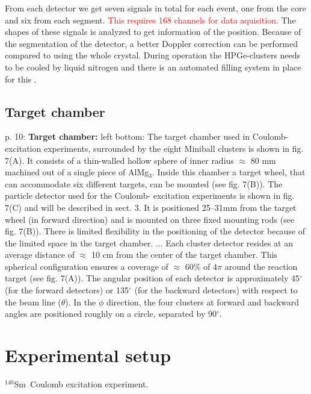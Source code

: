 \documentclass[twoside,english]{uiofysmaster/uiofysmaster}
\newcommand{\Sm}{$^{140}$Sm} %
\begin{document}
From each detector we get seven signals in total for each event, one from the core and six from each segment. \textcolor{red}{This requires 168 channels for data aquisition.} The shapes of these signals is analyzed to get information of the position. Because of the segmentation of the detector, a better Doppler correction can be performed compared to using the whole crystal. During operation the HPGe-clusters needs to be cooled by liquid nitrogen and there is an automated filling system in place for this \cite{NWarr-HPGe}. 


\subsection{Target chamber}
p. 10: \newline
\textbf{Target chamber:} \newline
left bottom: \newline
The target chamber used in Coulomb-excitation experiments, surrounded by the eight Miniball clusters is shown in fig. 7(A). It consists of a thin-walled hollow sphere of inner radius $\approx$ 80 mm machined out of a single piece of AlMg$_3$. Inside this chamber a target wheel, that can accommodate six different targets, can be mounted (see fig. 7(B)). The particle detector used for the Coulomb- excitation experiments is shown in fig. 7(C) and will be described in sect. 3. It is positioned 25–31mm from the target wheel (in forward direction) and is mounted on three fixed mounting rods (see fig. 7(B)). There is limited flexibility in the positioning of the detector because of the limited space in the target chamber. \newline
... Each cluster detector resides at an average distance of $\approx$ 10 cm from the center of the target chamber. This spherical configuration ensures a coverage of $\approx$ 60$\%$ of 4$\pi$ around the reaction target (see fig. 7(A)). The angular position of each detector is approximately 45$^\circ$ (for the forward detectors) or 135$^\circ$ (for the backward detectors) with respect to the beam line ($\theta$). In the $\phi$ direction, the four clusters at forward and backward angles are positioned roughly on a circle, separated by 90$^\circ$. \newline

\section{Experimental setup}
\Sm\ Coulomb excitation experiment.
\end{document}
